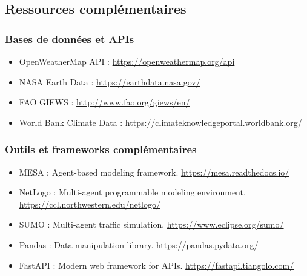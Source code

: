 \subsection{Ressources complémentaires}

\subsubsection{Bases de données et APIs}
\begin{itemize}
    \item OpenWeatherMap API : \url{https://openweathermap.org/api}
    \item NASA Earth Data : \url{https://earthdata.nasa.gov/}
    \item FAO GIEWS : \url{http://www.fao.org/giews/en/}
    \item World Bank Climate Data : \url{https://climateknowledgeportal.worldbank.org/}
\end{itemize}

\subsubsection{Outils et frameworks complémentaires}
\begin{itemize}
    \item MESA : Agent-based modeling framework. \url{https://mesa.readthedocs.io/}
    \item NetLogo : Multi-agent programmable modeling environment. \url{https://ccl.northwestern.edu/netlogo/}
    \item SUMO : Multi-agent traffic simulation. \url{https://www.eclipse.org/sumo/}
    \item Pandas : Data manipulation library. \url{https://pandas.pydata.org/}
    \item FastAPI : Modern web framework for APIs. \url{https://fastapi.tiangolo.com/}
\end{itemize}
